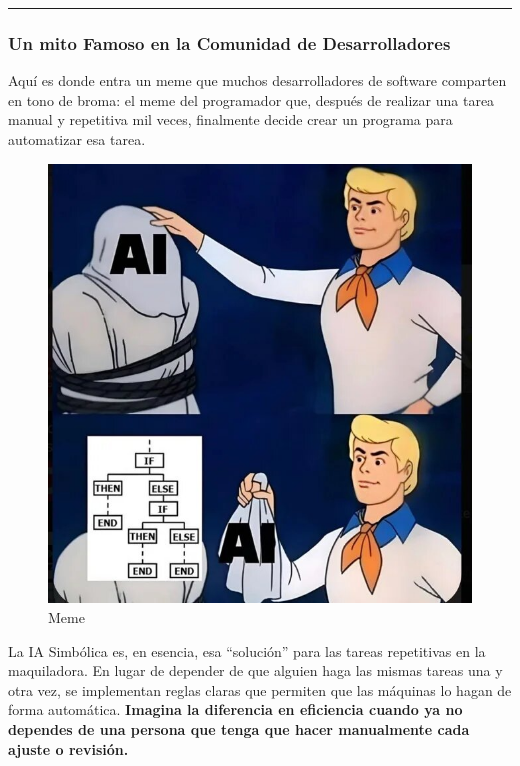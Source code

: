 \documentclass[
  10pt,
  letterpaper,
]{book}
\begin{document}
\begin{center}\rule{0.5\linewidth}{0.5pt}\end{center}

\subsubsection{Un mito Famoso en la Comunidad de
Desarrolladores}\label{un-mito-famoso-en-la-comunidad-de-desarrolladores}

Aquí es donde entra un meme que muchos desarrolladores de software
comparten en tono de broma: el meme del programador que, después de
realizar una tarea manual y repetitiva mil veces, finalmente decide
crear un programa para automatizar esa tarea.

\begin{figure}[H]

{\centering \includegraphics{Img/ia.jpg}

}

\caption{Meme}

\end{figure}%

La IA Simbólica es, en esencia, esa ``solución'' para las tareas
repetitivas en la maquiladora. En lugar de depender de que alguien haga
las mismas tareas una y otra vez, se implementan reglas claras que
permiten que las máquinas lo hagan de forma automática. \textbf{Imagina
la diferencia en eficiencia cuando ya no dependes de una persona que
tenga que hacer manualmente cada ajuste o revisión.}
\end{document}
